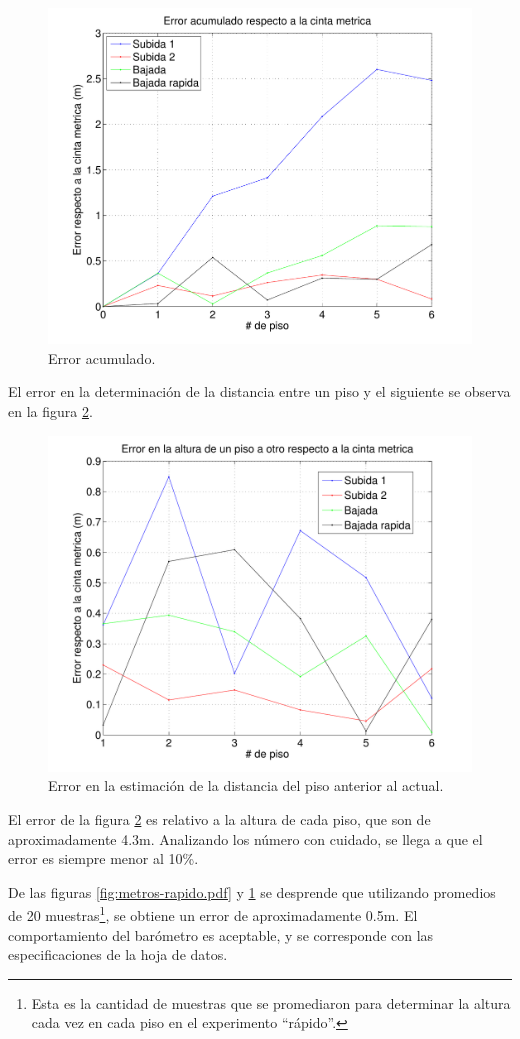 \documentclass[spanish,12pt,a4paper,titlepage]{report}
\begin{document}
\begin{figure}[h!]
\centering
  \includegraphics[width=.65\textwidth]{./pics/metros-err-accum.pdf}
\vspace{-15pt}
  \caption{Error acumulado.}
  \label{fig:metros-err-accum.pdf}
\vspace{-15pt}
\end{figure}

\newpage
El error en la determinación de la distancia entre un piso y el siguiente se observa en la figura \ref{fig:metros-err-piso-a-piso.pdf}.

\begin{figure}[h!]
\centering
  \includegraphics[width=.65\textwidth]{./pics/metros-err-piso-a-piso.pdf}
\vspace{-15pt}
  \caption{Error en la estimación de la distancia del piso anterior al actual.}
  \label{fig:metros-err-piso-a-piso.pdf}
\end{figure}

El error de la figura \ref{fig:metros-err-piso-a-piso.pdf} es relativo a la altura de cada piso, que son de aproximadamente 4.3m. Analizando los número con cuidado, se llega a que el error es siempre menor al 10\%.

De las figuras \ref{fig:metros-rapido.pdf} y \ref{fig:metros-err-accum.pdf} se desprende que utilizando promedios de 20 muestras\footnote{Esta es la cantidad de muestras que se promediaron para determinar la altura cada vez en cada piso en el experimento ``rápido''.}, se obtiene un error de aproximadamente 0.5m. El comportamiento del barómetro es aceptable, y se corresponde con las especificaciones de la hoja de datos.
\end{document}

